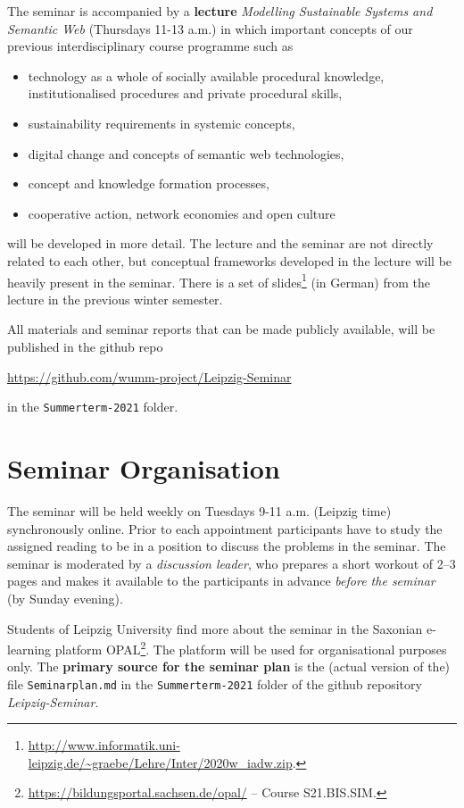 \documentclass[11pt,a4paper]{article}
\begin{document}
The seminar is accompanied by a \textbf{lecture} \emph{Modelling Sustainable
  Systems and Semantic Web} (Thursdays 11-13 a.m.) in which important concepts
of our previous interdisciplinary course programme such as
\begin{itemize}[noitemsep]
\item technology as a whole of socially available procedural knowledge,
  institutionalised procedures and private procedural skills, 
\item sustainability requirements in systemic concepts,
\item digital change and concepts of semantic web technologies,
\item concept and knowledge formation processes,
\item cooperative action, network economies and open culture
\end{itemize}
will be developed in more detail. The lecture and the seminar are not directly
related to each other, but conceptual frameworks developed in the lecture will
be heavily present in the seminar. There is a set of
slides\footnote{\url{http://www.informatik.uni-leipzig.de/~graebe/Lehre/Inter/2020w_iadw.zip}. }
(in German) from the lecture in the previous winter semester.

All materials and seminar reports that can be made publicly available, will be
published in the github repo
\begin{center}
  \url{https://github.com/wumm-project/Leipzig-Seminar}
\end{center}
in the \texttt{Summerterm-2021} folder.

\section{Seminar Organisation}

The seminar will be held weekly on Tuesdays 9-11 a.m. (Leipzig time)
synchronously online.  Prior to each appointment participants have to study
the assigned reading to be in a position to discuss the problems in the
seminar.  The seminar is moderated by a \emph{discussion leader}, who prepares
a short workout of 2--3 pages and makes it available to the participants in
advance \emph{before the seminar} (by Sunday evening).

Students of Leipzig University find more about the seminar in the Saxonian
e-learning platform
OPAL\footnote{\url{https://bildungsportal.sachsen.de/opal/} -- Course
  S21.BIS.SIM.}.  The platform will be used for organisational purposes only.
The \textbf{primary source for the seminar plan} is the (actual version of
the) file \texttt{Seminarplan.md} in the \texttt{Summerterm-2021} folder of
the github repository \emph{Leipzig-Seminar}.
\end{document}
